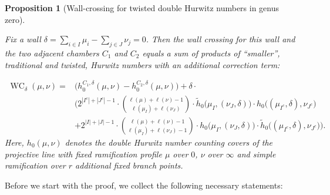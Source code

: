 \documentclass[10pt]{amsart}
\theoremstyle{plain}
\theoremstyle{definition}
\theoremstyle{definition}
\theoremstyle{plain}
\theoremstyle{plain}
\newtheorem{prop}[prop]{Proposition}
\theoremstyle{remark}
\theoremstyle{plain}
\theoremstyle{plain}
\DeclareMathOperator {\WC}{WC}
\begin{document}
\begin{prop}[Wall-crossing for twisted double Hurwitz numbers in genus zero]
\label{thm-wc}

Fix a wall $\delta=\sum_{i\in I}\mu_i - \sum_{j\in J}\nu_j=0$.
Then the wall crossing for this wall and the two adjacent chambers $C_1$ and $C_2$ equals a sum of products of ``smaller'', traditional and twisted, Hurwitz numbers with an additional correction term:

\begin{align*}
\WC_{\delta}(\mu,\nu)= &\big(h_0^{C_1,\delta}(\mu,\nu)- h_0^{C_2,\delta}(\mu,\nu)\big)+
  \delta\cdot \\
&\Big(2^{|I^c|+|J^c|-1}\cdot\binom{\ell(\mu)+\ell(\nu)-1}{\ell(\mu_I)+\ell(\nu_J)}\cdot \tilde{h}_0\big(\mu_I,(\nu_J,\delta)\big)\cdot h_0\big((\mu_{I^c},\delta),\nu_{J^c}\big)
\\&+2^{|I|+|J|-1}\cdot\binom{\ell(\mu)+\ell(\nu)-1}{\ell(\mu_I)+\ell(\nu_J)-1}\cdot h_0\big(\mu_I,(\nu_J,\delta)\big)\cdot \tilde{h}_0\big((\mu_{I^c},\delta),\nu_{J^c}\big)\Big).
\end{align*}
Here, $h_0(\mu,\nu)$ denotes the double Hurwitz number counting covers of the projective line with fixed ramification profile $\mu$ over $0$, $\nu$ over $\infty$ and simple ramification over $r$ additional fixed branch points.
\end{prop}

Before we start with the proof, we collect the following necessary statements:
\end{document}
